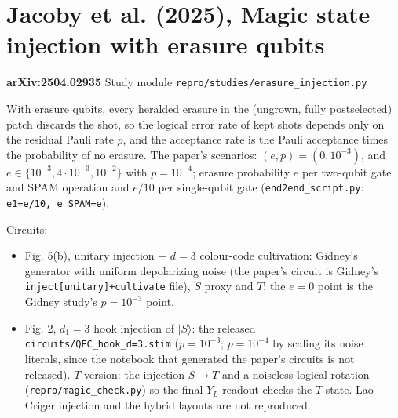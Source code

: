 \documentclass[10pt]{article}
\begin{document}
\begin{table}[H]
\centering\small
\caption*{\textbf{Chen et al. Table 1, ungrown columns: cultivation without escape, $p=10^{-3}$}\\ The paper's Table 1 rows and ungrown columns (the end-to-end columns need a decoder). MSC-3/5: the authors' RP$^2$ circuits; MSC ($d_\text{color}=3,5$): Gidney et al.'s colour-code cultivation, whose Tsim GPU values are the Gidney study's points. Every detector postselected, perfect final stabilizer round and logical readout.\\ \textit{Compute: 1.61 h GPU sampling + 5.4 s compile, 2.1e13 shots, 4 points (NVIDIA GeForce RTX 5090, Tsim a2af975f)}}
\resizebox{\linewidth}{!}{}
\end{table}

\clearpage

\section{Jacoby et al. (2025), Magic state injection with erasure qubits}\label{sec:erasure_injection}

\noindent\textbf{arXiv:2504.02935} \quad Study module \texttt{repro/studies/erasure\_injection.py}


With erasure qubits, every heralded erasure in the (ungrown, fully postselected) patch discards the shot, so the logical error rate of kept shots depends only on the residual Pauli rate $p$, and the acceptance rate is the Pauli acceptance times the probability of no erasure. The paper's scenarios: $(e, p) = (0, 10^{-3})$, and $e \in \{10^{-3}, 4\cdot10^{-3}, 10^{-2}\}$ with $p = 10^{-4}$; erasure probability $e$ per two-qubit gate and SPAM operation and $e/10$ per single-qubit gate (\texttt{end2end\_script.py}: \texttt{e1=e/10, e\_SPAM=e}).

Circuits:

\begin{itemize}\setlength\itemsep{0pt}
\item Fig. 5(b), unitary injection + $d=3$ colour-code cultivation: Gidney's generator with uniform depolarizing noise (the paper's circuit is Gidney's \texttt{inject[unitary]+cultivate} file), $S$ proxy and $T$; the $e=0$ point is the Gidney study's $p=10^{-3}$ point.
\item Fig. 2, $d_1=3$ hook injection of $|S\rangle$: the released \texttt{circuits/QEC\_hook\_d=3.stim} ($p=10^{-3}$; $p=10^{-4}$ by scaling its noise literals, since the notebook that generated the paper's circuits is not released). $T$ version: the injection $S\to T$ and a noiseless logical rotation (\texttt{repro/magic\_check.py}) so the final $Y_L$ readout checks the $T$ state. Lao--Criger injection and the hybrid layouts are not reproduced.
\end{itemize}
\end{document}

